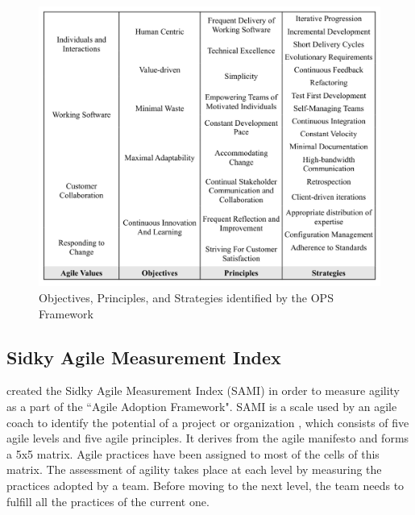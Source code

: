 \begin{figure} [H]
\centerline{\includegraphics[scale=0.75]{include/relatedwork/fig/ops.pdf}}
\caption{Objectives, Principles, and Strategies identified by the \ac{OPS} Framework} 
\label{objectives_principles_strategies}
\end{figure} 

%

\subsection{Sidky Agile Measurement Index} %
\citet{sidky_dissertation} created the Sidky Agile Measurement Index (SAMI) in order to measure agility as a part of the ``Agile Adoption Framework". SAMI is a scale used by an agile coach to identify the potential of a project or organization \cite{sidky}, which consists of five agile levels and five agile principles. It derives from the agile manifesto \cite{beck2001agile}and forms a 5x5 matrix. Agile practices have been assigned to most of the cells of this matrix. The assessment of agility takes place at each level by measuring the practices adopted by a team. Before moving to the next level, the team needs to fulfill all the practices of the current one.

